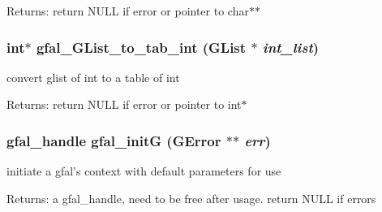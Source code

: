 \begin{Desc}
\item[Returns:]return NULL if error or pointer to char$\ast$$\ast$ \end{Desc}
\subsubsection{\setlength{\rightskip}{0pt plus 5cm}int$\ast$ gfal\_\-GList\_\-to\_\-tab\_\-int (GList $\ast$ {\em int\_\-list})}\label{gfal__common__all_8c_87219c9e2c6323b67c2ac70354ee2645}


convert glist of int to a table of int 

\begin{Desc}
\item[Returns:]return NULL if error or pointer to int$\ast$ \end{Desc}
\subsubsection{\setlength{\rightskip}{0pt plus 5cm}gfal\_\-handle gfal\_\-init\-G (GError $\ast$$\ast$ {\em err})}\label{gfal__common__all_8c_8410ba458f920d8f8a8f0e5594170fe4}


initiate a gfal's context with default parameters for use \begin{Desc}
\item[Returns:]a gfal\_\-handle, need to be free after usage. return NULL if errors \end{Desc}
